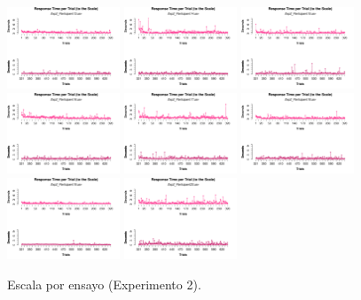 \begin{figure}[th]
\includegraphics[width=0.30\textwidth]{Figures/RT2_Exp2_P13} \includegraphics[width=0.30\textwidth]{Figures/RT2_Exp2_P14} \includegraphics[width=0.30\textwidth]{Figures/RT2_Exp2_P15}
\includegraphics[width=0.30\textwidth]{Figures/RT2_Exp2_P16} \includegraphics[width=0.30\textwidth]{Figures/RT2_Exp2_P17} \includegraphics[width=0.30\textwidth]{Figures/RT2_Exp2_P18}
\includegraphics[width=0.30\textwidth]{Figures/RT2_Exp2_P19} \includegraphics[width=0.30\textwidth]{Figures/RT2_Exp2_P20} 
\caption[Rating_Exp2]{Escala por ensayo (Experimento 2).}
\label{fig:Rating_E2}
\end{figure}



